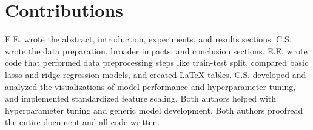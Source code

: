 
\section{Contributions}
\label{sec:contrib}

E.E. wrote the abstract, introduction, experiments, and results sections. C.S. wrote the data preparation, broader impacts, and conclusion sections. E.E. wrote code that performed data preprocessing steps like train-test split, compared basic lasso and ridge regression models, and created LaTeX tables. C.S. developed and analyzed the visualizations of model performance and hyperparameter tuning, and implemented standardized feature scaling. Both authors helped with hyperparameter tuning and generic model development. Both authors proofread the entire document and all code written. 

